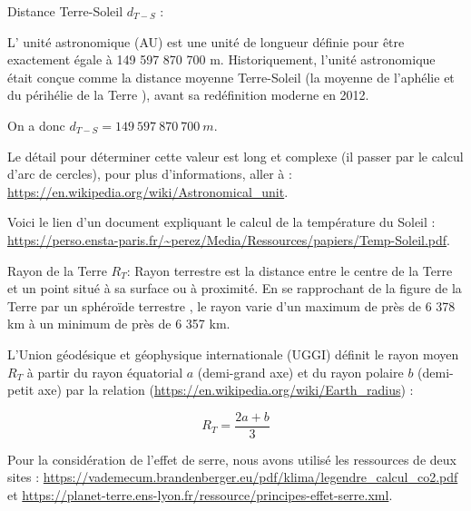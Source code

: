\documentclass[a4paper,11pt]{article}
\begin{document}
Distance Terre-Soleil $d_{T-S}$ :

L' unité astronomique (AU) est une unité de longueur définie pour être exactement égale à 149 597 870 700 m. Historiquement, l'unité astronomique était conçue comme la distance moyenne Terre-Soleil (la moyenne de l'aphélie et du périhélie de la Terre ), avant sa redéfinition moderne en 2012. 

On a donc $d_{T-S} = 149~597~870~700~m$.

Le détail pour déterminer cette valeur est long et complexe (il passer par le calcul d'arc de cercles), pour plus d'informations, aller à : \url{https://en.wikipedia.org/wiki/Astronomical_unit}.

Voici le lien d'un document expliquant le calcul de la température du Soleil : \url{https://perso.ensta-paris.fr/~perez/Media/Ressources/papiers/Temp-Soleil.pdf}.

Rayon de la Terre $R_T$:
Rayon terrestre est la distance entre le centre de la Terre et un point situé à sa surface ou à proximité. En se rapprochant de la figure de la Terre par un sphéroïde terrestre , le rayon varie d'un maximum de près de 6 378 km à un minimum de près de 6 357 km.

L'Union géodésique et géophysique internationale (UGGI) définit le rayon moyen $R_T$ à partir du rayon équatorial $a$ (demi-grand axe) et du rayon polaire $b$ (demi-petit axe) par la relation (\url{https://en.wikipedia.org/wiki/Earth_radius}) :

\[R_T = \dfrac {2a+b}{3}\]

Pour la considération de l'effet de serre, nous avons utilisé les ressources de deux sites : \url{https://vademecum.brandenberger.eu/pdf/klima/legendre_calcul_co2.pdf} et \url{https://planet-terre.ens-lyon.fr/ressource/principes-effet-serre.xml}.
\end{document}

